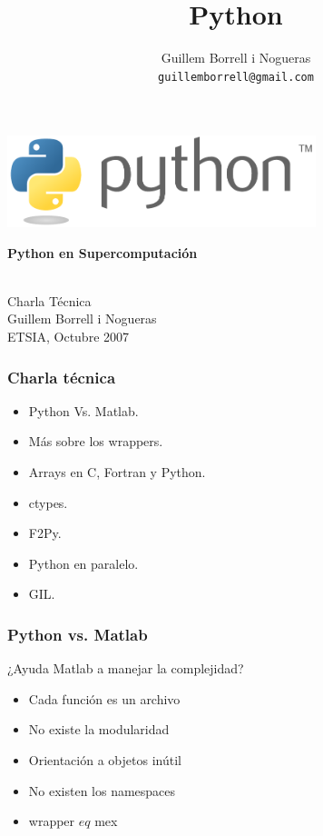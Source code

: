 \documentclass{beamer}
\title{Python}
\author{
Guillem Borrell i Nogueras\\
\texttt{guillemborrell@gmail.com}
}
\begin{document}
\begin{frame}
\begin{center}
 \includegraphics[width=9cm]{files/python-logo-generic.pdf}\\
\begin{large}
\textbf{Python en Supercomputación}
\end{large}\\
Charla Técnica\\

Guillem Borrell i Nogueras\\

ETSIA, Octubre 2007
\end{center}

\end{frame}

\begin{frame}
 \frametitle{Charla técnica}
\begin{itemize}
 \item Python Vs. Matlab.
 \item Más sobre los wrappers.
 \item Arrays en C, Fortran y Python.
 \item ctypes.
 \item F2Py.
 \item Python en paralelo.
 \item GIL.
\end{itemize}

\end{frame}

\begin{frame}
 \frametitle{Python vs. Matlab}
\begin{center}
 ¿Ayuda Matlab a manejar la complejidad?
\end{center}
\begin{itemize}
 \item Cada función es un archivo
 \item No existe la modularidad
 \item Orientación a objetos inútil
 \item No existen los namespaces
 \item wrapper $eq$ mex
\end{itemize}
\end{frame}
\end{document}

